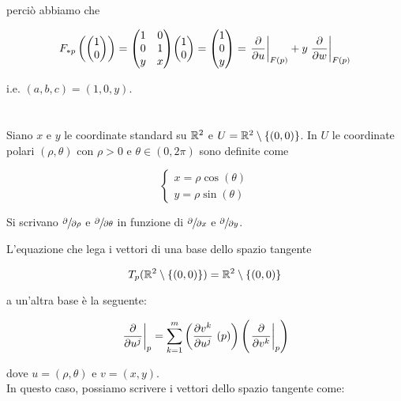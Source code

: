 perciò abbiamo che

\begin{equation}
	F_{*p} \left( \mqty( 1 \\ 0 ) \right) = \mqty( 1 & 0 \\ 0 & 1 \\ y & x ) \mqty( 1 \\ 0 ) = \mqty( 1 \\ 0 \\ y ) = \eval{\pdv{u}}_{F(p)} + y \eval{\pdv{w}}_{F(p)}
\end{equation}

i.e. $ (a,b,c) = (1,0,y) $.

\tocless\section{}\label{es2-9}

\begin{tcolorbox}
	Siano $ x $ e $ y $ le coordinate standard su $ \mathbb{R}^{2} $ e $ U = \mathbb{R}^{2} \setminus \{(0,0)\} $. In $ U $ le coordinate polari $ (\rho, \theta) $ con $ \rho > 0 $ e $ \theta \in (0,2\pi) $ sono definite come
	
	\begin{equation}
		\begin{cases}
			x = \rho \cos(\theta)\\
			y = \rho \sin(\theta)
		\end{cases}
	\end{equation}
	
	Si scrivano $ \sfrac{\partial}{\partial \rho} $ e $ \sfrac{\partial}{\partial \theta} $ in funzione di $ \sfrac{\partial}{\partial x} $ e $ \sfrac{\partial}{\partial y} $.
\end{tcolorbox}

L'equazione che lega i vettori di una base dello spazio tangente

\begin{equation}
	T_{p}(\mathbb{R}^{2} \setminus \{(0,0)\}) = \mathbb{R}^{2} \setminus \{(0,0)\}
\end{equation}

a un'altra base è la seguente:

\begin{equation}
	\eval{\pdv{u^{j}}}_{p} = \sum_{k=1}^{m} \left( \pdv{v^{k}}{u^{j}}\ (p) \right) \left( \eval{\pdv{v^{k}}}_{p} \right)
\end{equation}

dove $ u = (\rho,\theta) $ e $ v = (x,y) $.\\
In questo caso, possiamo scrivere i vettori dello spazio tangente come:


